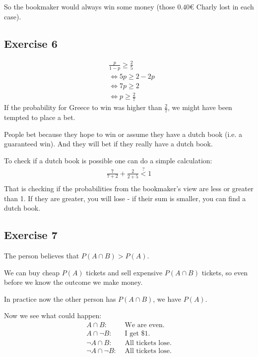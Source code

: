 So the bookmaker would always win some money (those $0.40 \euro$ Charly lost in each case).

\subsection*{Exercise 6}
\begin{align*}
& \frac{p}{1-p} \geq \frac{2}{5}\\
& \Leftrightarrow 5p \geq 2 - 2p\\
& \Leftrightarrow 7p \geq 2\\
& \Leftrightarrow p \geq \frac{2}{7}
\end{align*}
If the probability for Greece to win was higher than $\frac{2}{7}$, we might have been tempted to place a bet.

People bet because they hope to win or assume they have a dutch book (i.e. a guaranteed win). And they will bet if they really have a dutch book.

To check if a dutch book is possible one can do a simple calculation:
\begin{align*}
\frac{7}{7+2} + \frac{2}{2+5} \stackrel{?}{<} 1 \\
\end{align*}
That is checking if the probabilities from the bookmaker's view are less or greater than 1. If they are greater, you will lose - if their sum is smaller, you can find a dutch book.


\subsection*{Exercise 7}
The person believes that $P(A \cap B)>P(A)$.

We can buy cheap $P(A)$ tickets and sell expensive $P(A\cap B)$ tickets, so even before we know the outcome we make money.

In practice now the other person has $P(A \cap B)$, we have $P(A)$.

Now we see what could happen:
\begin{align*}
     A \cap      B:& \mbox{ We are even.}      \\
     A \cap \neg B:& \mbox{ I get \$ 1.}       \\
\neg A \cap      B:& \mbox{ All tickets lose.} \\
\neg A \cap \neg B:& \mbox{ All tickets lose.}
\end{align*}

